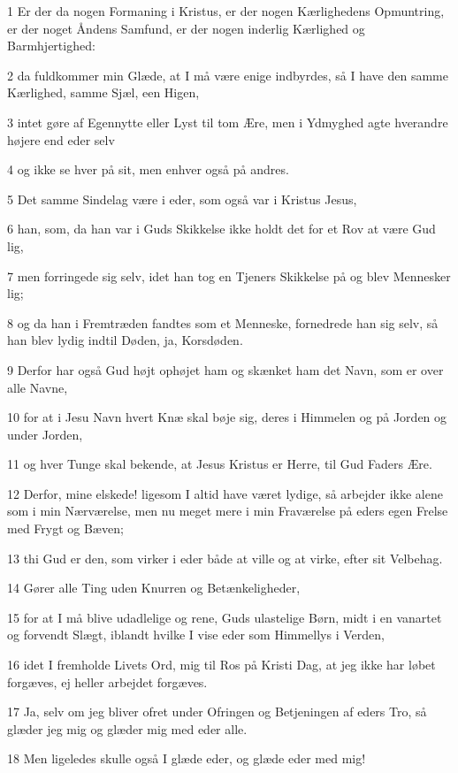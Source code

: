 \par 1 Er der da nogen Formaning i Kristus, er der nogen Kærlighedens Opmuntring, er der noget Åndens Samfund, er der nogen inderlig Kærlighed og Barmhjertighed:
\par 2 da fuldkommer min Glæde, at I må være enige indbyrdes, så I have den samme Kærlighed, samme Sjæl, een Higen,
\par 3 intet gøre af Egennytte eller Lyst til tom Ære, men i Ydmyghed agte hverandre højere end eder selv
\par 4 og ikke se hver på sit, men enhver også på andres.
\par 5 Det samme Sindelag være i eder, som også var i Kristus Jesus,
\par 6 han, som, da han var i Guds Skikkelse ikke holdt det for et Rov at være Gud lig,
\par 7 men forringede sig selv, idet han tog en Tjeners Skikkelse på og blev Mennesker lig;
\par 8 og da han i Fremtræden fandtes som et Menneske, fornedrede han sig selv, så han blev lydig indtil Døden, ja, Korsdøden.
\par 9 Derfor har også Gud højt ophøjet ham og skænket ham det Navn, som er over alle Navne,
\par 10 for at i Jesu Navn hvert Knæ skal bøje sig, deres i Himmelen og på Jorden og under Jorden,
\par 11 og hver Tunge skal bekende, at Jesus Kristus er Herre, til Gud Faders Ære.
\par 12 Derfor, mine elskede! ligesom I altid have været lydige, så arbejder ikke alene som i min Nærværelse, men nu meget mere i min Fraværelse på eders egen Frelse med Frygt og Bæven;
\par 13 thi Gud er den, som virker i eder både at ville og at virke, efter sit Velbehag.
\par 14 Gører alle Ting uden Knurren og Betænkeligheder,
\par 15 for at I må blive udadlelige og rene, Guds ulastelige Børn, midt i en vanartet og forvendt Slægt, iblandt hvilke I vise eder som Himmellys i Verden,
\par 16 idet I fremholde Livets Ord, mig til Ros på Kristi Dag, at jeg ikke har løbet forgæves, ej heller arbejdet forgæves.
\par 17 Ja, selv om jeg bliver ofret under Ofringen og Betjeningen af eders Tro, så glæder jeg mig og glæder mig med eder alle.
\par 18 Men ligeledes skulle også I glæde eder, og glæde eder med mig!
